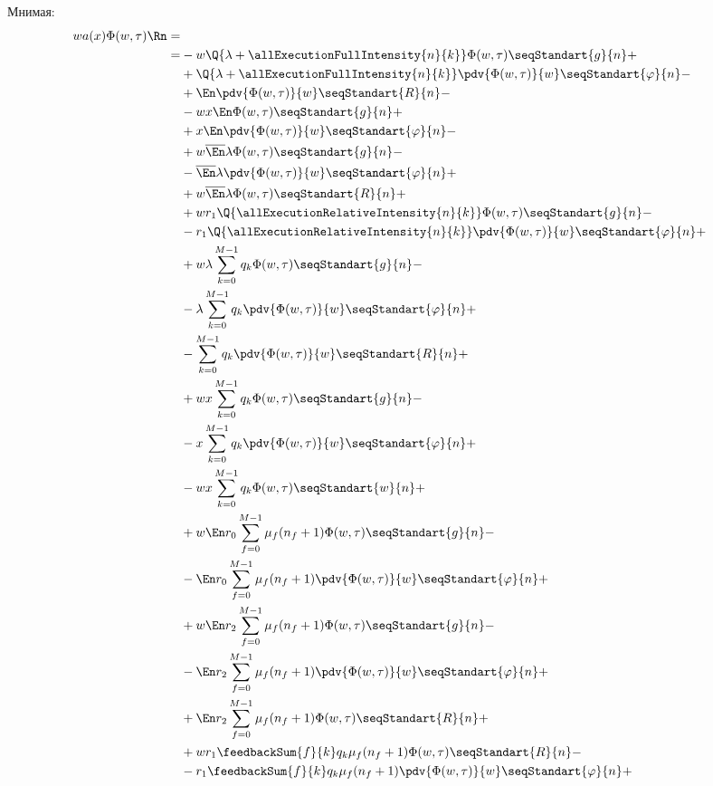 Мнимая:
{\allowdisplaybreaks\begin{align*}
wa(x) \Phi (w, \tau) \Rn = \\=
    &- w\Q{\lambda+\allExecutionFullIntensity{n}{k}}
        \Phi(w, \tau)\seqStandart{g}{n}+\\
    &+\Q{\lambda+\allExecutionFullIntensity{n}{k}}
        \pdv{\Phi(w,\tau)}{w}\seqStandart{\varphi}{n}-\\
    &+ \En \pdv{\Phi(w,\tau)}{w}
        \seqStandart{R}{n} - \\
    &- w x \En \Phi(w, \tau) \seqStandart{g}{n} + \\
    &+ x \En \pdv{\Phi(w,\tau)}{w} \seqStandart{\varphi}{n}- \\
    &+ w \overline{\En} \lambda 
        \Phi(w, \tau)\seqStandart{g}{n}-\\
    &- \overline{\En} \lambda 
        \pdv{\Phi(w, \tau)}{w}\seqStandart{\varphi}{n}+\\
    &+ w\overline{\En} \lambda  
        \Phi(w, \tau)\seqStandart{R}{n}+\\
    &+ w r_1 \Q{\allExecutionRelativeIntensity{n}{k}} 
        \Phi(w, \tau)\seqStandart{g}{n}-\\
    &- r_1 \Q{\allExecutionRelativeIntensity{n}{k}} 
        \pdv{\Phi(w, \tau)}{w}\seqStandart{\varphi}{n}+\\
    &+ w \lambda\sum_{k=0}^{M-1}q_k 
        \Phi(w, \tau)\seqStandart{g}{n}-\\
    &- \lambda\sum_{k=0}^{M-1}q_k 
        \pdv{\Phi(w, \tau)}{w}\seqStandart{\varphi}{n}+\\
    &- \sum_{k=0}^{M-1}q_k 
        \pdv{\Phi(w, \tau)}{w}\seqStandart{R}{n}+\\
    &+ w x \sum_{k=0}^{M-1}q_k 
        \Phi(w, \tau)\seqStandart{g}{n}-\\
    &- x \sum_{k=0}^{M-1}q_k 
        \pdv{\Phi(w, \tau)}{w}\seqStandart{\varphi}{n}+\\
    &- w x \sum_{k=0}^{M-1}q_k 
        \Phi(w, \tau)\seqStandart{w}{n}+\\
    &+ w\En r_0 \sum_{f=0}^{M-1} \mu_f (n_f + 1)
        \Phi(w, \tau)\seqStandart{g}{n}-\\
    &- \En r_0 \sum_{f=0}^{M-1} \mu_f (n_f + 1)
        \pdv{\Phi(w, \tau)}{w}\seqStandart{\varphi}{n}+\\
    &+ w\En r_2 \sum_{f=0}^{M-1} \mu_f (n_f + 1)
        \Phi(w, \tau)\seqStandart{g}{n}-\\
    &- \En r_2 \sum_{f=0}^{M-1} \mu_f (n_f + 1)
        \pdv{\Phi(w, \tau)}{w}\seqStandart{\varphi}{n}+\\
    &+ \En r_2 \sum_{f=0}^{M-1} \mu_f (n_f + 1)
        \Phi(w, \tau)\seqStandart{R}{n}+\\
    &+ w r_1 \feedbackSum{f}{k} q_k \mu_f (n_f+1)
        \Phi(w, \tau)\seqStandart{R}{n}-\\
    &- r_1 \feedbackSum{f}{k} q_k \mu_f (n_f+1)
        \pdv{\Phi(w, \tau)}{w}\seqStandart{\varphi}{n}+\\
\end{align*}}
  
